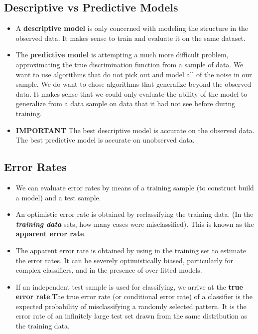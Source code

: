 \documentclass[]{report}
\begin{document}
\subsection{Descriptive vs Predictive Models}

\begin{itemize}
	\item A \textbf{descriptive model} is only concerned with modeling the structure in the observed data. It makes sense to train and evaluate it on the same dataset.
	
	\item The \textbf{predictive model} is attempting a much more difficult problem, approximating the true discrimination function from a sample of data. We want to use algorithms that do not pick out and model all of the noise in our sample. We do want to chose algorithms that generalize beyond the observed data. It makes sense that we could only evaluate the ability of the model to generalize from a data sample on data that it had not see before during training.
	
	\item \textbf{IMPORTANT} The best descriptive model is accurate on the observed data. The best predictive model is accurate on unobserved data.
\end{itemize}




\subsection{Error Rates}

\begin{itemize}
	\item We can evaluate error rates by means of a training sample (to construct build a model) and a test sample.
	
	
	\item 	An optimistic error rate is obtained by reclassifying the training data. (In the \textbf{\textit{training data}} sets, how many cases were misclassified). This is known as the \textbf{apparent error rate}.
	
	
	\item 	The apparent error rate is obtained by using in the training set to estimate
	the error rates. It can be severely optimistically biased, particularly for complex classifiers, and in the presence of over-fitted models.
	
	
	\item	If an independent test sample is used for classifying, we arrive at the  \textbf{true error rate}.The true error rate (or conditional error rate) of a classifier is the expected
	probability of misclassifying a randomly selected pattern.
	It is the error rate of an infinitely large test set drawn from the same distribution as the training data.
\end{itemize}
\end{document}
